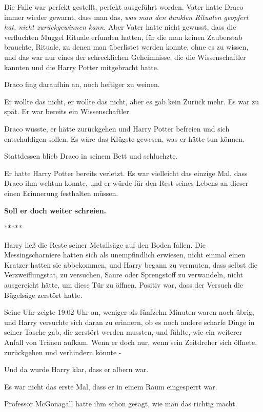 Die Falle war perfekt gestellt, perfekt ausgeführt worden. Vater hatte Draco
immer wieder gewarnt, dass man das, \emph{was man den dunklen Ritualen geopfert
hat, nicht zurückgewinnen kann.} Aber Vater hatte nicht gewusst, dass die
verfluchten Muggel Rituale erfunden hatten, für die man keinen Zauberstab
brauchte, Rituale, zu denen man überlistet werden konnte, ohne es zu wissen, und
das war nur eines der schrecklichen Geheimnisse, die die Wissenschaftler kannten
und die Harry Potter mitgebracht hatte.

Draco fing daraufhin an, noch heftiger zu weinen.

Er wollte das nicht, er wollte das nicht, aber es gab kein Zurück mehr. Es war
zu spät. Er war bereits ein Wissenschaftler.

Draco wusste, er hätte zurückgehen und Harry Potter befreien und sich
entschuldigen sollen. Es wäre das Klügste gewesen, was er hätte tun können.

Stattdessen blieb Draco in seinem Bett und schluchzte.

Er hatte Harry Potter bereits verletzt. Es war vielleicht das einzige Mal, dass
Draco ihm wehtun konnte, und er würde für den Rest seines Lebens an dieser einen
Erinnerung festhalten müssen.

\textbf{Soll er doch weiter schreien.}

\begin{center}*****\end{center}

Harry ließ die Reste seiner Metallsäge auf den Boden fallen. Die
Messingscharniere hatten sich als unempfindlich erwiesen, nicht einmal einen
Kratzer hatten sie abbekommen, und Harry begann zu vermuten, dass selbst die
Verzweiflungstat, zu versuchen, Säure oder Sprengstoff zu verwandeln, nicht
ausgereicht hätte, um diese Tür zu öffnen. Positiv war, dass der Versuch die
Bügelsäge zerstört hatte.

Seine Uhr zeigte 19:02 Uhr an, weniger als fünfzehn Minuten waren noch übrig,
und Harry versuchte sich daran zu erinnern, ob es noch andere scharfe Dinge in
seiner Tasche gab, die zerstört werden mussten, und fühlte, wie ein weiterer
Anfall von Tränen aufkam. Wenn er doch nur, wenn sein Zeitdreher sich öffnete,
zurückgehen und verhindern könnte -

Und da wurde Harry klar, dass er albern war.

Es war nicht das erste Mal, dass er in einem Raum eingesperrt war.

Professor McGonagall hatte ihm schon gesagt, wie man das richtig macht.

